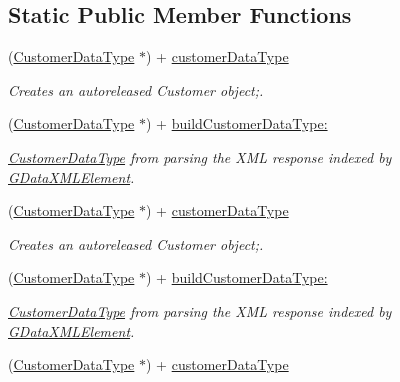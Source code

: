 \subsection*{Static Public Member Functions}
\begin{DoxyCompactItemize}
\item 
(\hyperlink{interface_customer_data_type}{CustomerDataType} $\ast$) + \hyperlink{interface_customer_data_type_a1a90d423f00ea98ae284402f6613574b}{customerDataType}
\begin{DoxyCompactList}\small\item\em Creates an autoreleased Customer object;. \item\end{DoxyCompactList}\item 
(\hyperlink{interface_customer_data_type}{CustomerDataType} $\ast$) + \hyperlink{interface_customer_data_type_a211da3a7a3ca1a622fe3505eba7834d4}{buildCustomerDataType:}
\begin{DoxyCompactList}\small\item\em \hyperlink{interface_customer_data_type}{CustomerDataType} from parsing the XML response indexed by \hyperlink{interface_g_data_x_m_l_element}{GDataXMLElement}. \item\end{DoxyCompactList}\item 
(\hyperlink{interface_customer_data_type}{CustomerDataType} $\ast$) + \hyperlink{interface_customer_data_type_a1a90d423f00ea98ae284402f6613574b}{customerDataType}
\begin{DoxyCompactList}\small\item\em Creates an autoreleased Customer object;. \item\end{DoxyCompactList}\item 
(\hyperlink{interface_customer_data_type}{CustomerDataType} $\ast$) + \hyperlink{interface_customer_data_type_a211da3a7a3ca1a622fe3505eba7834d4}{buildCustomerDataType:}
\begin{DoxyCompactList}\small\item\em \hyperlink{interface_customer_data_type}{CustomerDataType} from parsing the XML response indexed by \hyperlink{interface_g_data_x_m_l_element}{GDataXMLElement}. \item\end{DoxyCompactList}\item 
(\hyperlink{interface_customer_data_type}{CustomerDataType} $\ast$) + \hyperlink{interface_customer_data_type_a1a90d423f00ea98ae284402f6613574b}{customerDataType}

\end{DoxyCompactItemize}
